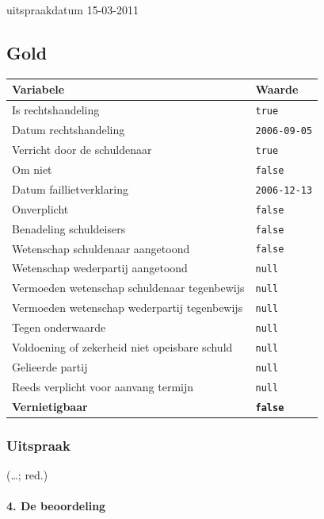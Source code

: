 \documentclass[
  dutch,
  a4paper,
]{article}
\begin{document}
uitspraakdatum 15-03-2011

\subsection{Gold}\label{gold-8}

\begin{center}
\small
\begin{tabular}{@{}p{8cm}p{2.6cm}@{}}
\toprule
Variabele & Waarde \\
\midrule
Is rechtshandeling & \texttt{true} \\
Datum rechtshandeling & \texttt{2006-09-05} \\
Verricht door de schuldenaar & \texttt{true} \\
Om niet & \texttt{false} \\
Datum faillietverklaring & \texttt{2006-12-13} \\
Onverplicht & \texttt{false} \\
Benadeling schuldeisers & \texttt{false} \\
Wetenschap schuldenaar aangetoond & \texttt{false} \\
Wetenschap wederpartij aangetoond & \texttt{null} \\
Vermoeden wetenschap schuldenaar tegenbewijs & \texttt{null} \\
Vermoeden wetenschap wederpartij tegenbewijs & \texttt{null} \\
Tegen onderwaarde & \texttt{null} \\
Voldoening of zekerheid niet opeisbare schuld & \texttt{null} \\
Gelieerde partij & \texttt{null} \\
Reeds verplicht voor aanvang termijn & \texttt{null} \\
\textbf{Vernietigbaar} & \textbf{\texttt{false}} \\
\bottomrule
\end{tabular}
\end{center}

\subsubsection{Uitspraak}\label{uitspraak-8}

(\ldots; red.)

\paragraph{4. De beoordeling}\label{de-beoordeling-4}
\end{document}

